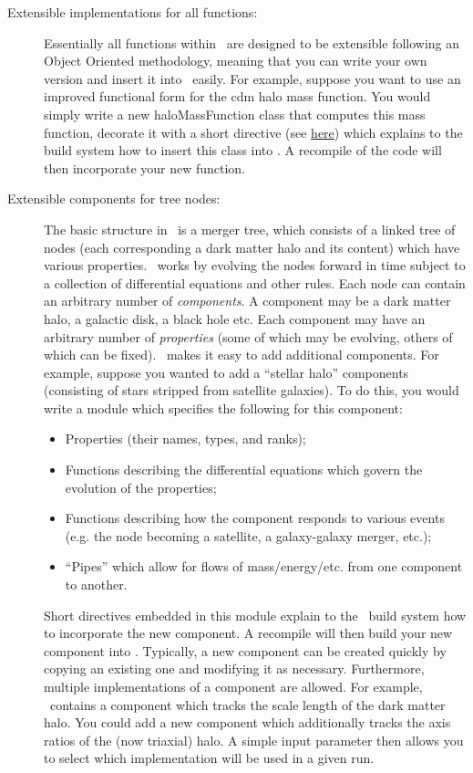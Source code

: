 \begin{description}
 \item [Extensible implementations for all functions:] Essentially all functions within \glc\ are designed to be extensible following an Object Oriented methodology, meaning that you can write your own version and insert it into \glc\ easily. For example, suppose you want to use an improved functional form for the \gls{cdm} halo mass function. You would simply write a new {\normalfont \ttfamily haloMassFunction} class that computes this mass function, decorate it with a short directive (see \href{https://github.com/galacticusorg/galacticus/releases/download/bleeding-edge/Galacticus_Development.pdf#sec.CodeDirectives}{here}) which explains to the build system how to insert this class into \glc. A recompile of the code will then incorporate your new function.

 \item [Extensible components for tree nodes:] The basic structure in \glc\ is a merger tree, which consists of a linked tree of nodes (each corresponding a dark matter halo and its content) which have various properties. \glc\ works by evolving the nodes forward in time subject to a collection of differential equations and other rules. Each node can contain an arbitrary number of \emph{components}. A component may be a dark matter halo, a galactic disk, a black hole etc. Each component may have an arbitrary number of \emph{properties} (some of which may be evolving, others of which can be fixed). \glc\ makes it easy to add additional components. For example, suppose you wanted to add a ``stellar halo'' components (consisting of stars stripped from satellite galaxies). To do this, you would write a module which specifies the following for this component:
 \begin{itemize}
  \item Properties (their names, types, and ranks);
  \item Functions describing the differential equations which govern the evolution of the properties;
  \item Functions describing how the component responds to various events (e.g. the node becoming a satellite, a galaxy-galaxy merger, etc.);
  \item ``Pipes'' which allow for flows of mass/energy/etc. from one component to another.
 \end{itemize}
 Short directives embedded in this module explain to the \glc\ build system how to incorporate the new component. A recompile will then build your new component into \glc. Typically, a new component can be created quickly by copying an existing one and modifying it as necessary. Furthermore, multiple implementations of a component are allowed. For example, \glc\ contains a component which tracks the scale length of the dark matter halo. You could add a new component which additionally tracks the axis ratios of the (now triaxial) halo. A simple input parameter then allows you to select which implementation will be used in a given run.


\end{description}
